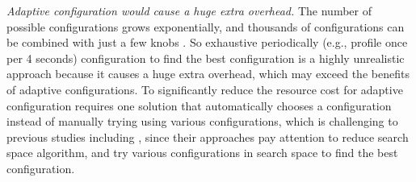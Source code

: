 \emph{Adaptive configuration would cause a huge extra overhead.} The number of possible configurations grows exponentially, and thousands of configurations can be combined with just a few knobs \cite{jiang2018chameleon}. So exhaustive periodically (e.g., profile once per 4 seconds) configuration to find the best configuration is a highly unrealistic approach because it causes a huge extra overhead, which may exceed the benefits of adaptive configurations. To significantly reduce the resource cost for adaptive configuration requires one solution that automatically chooses a configuration instead of manually trying using various configurations, which is challenging to previous studies including \cite{jiang2018chameleon,wang2020jcab}, since their approaches pay attention to reduce search space algorithm, and try various configurations in search space to find the best configuration.

